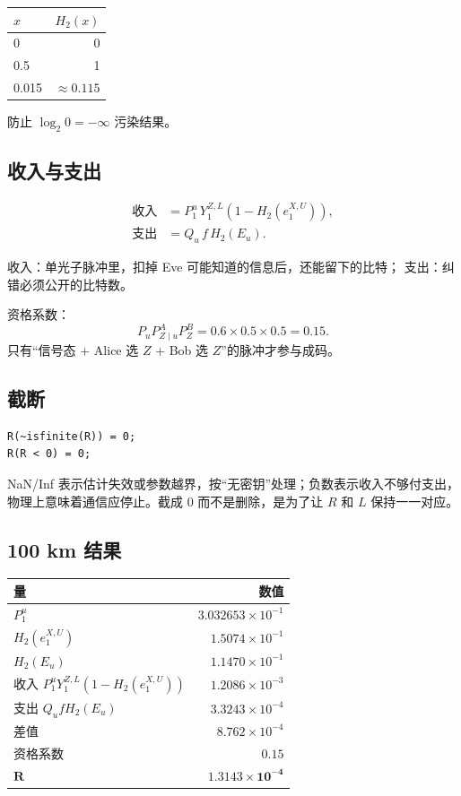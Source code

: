 \documentclass[UTF8,11pt,a4paper]{ctexart}
\newcommand{\code}[1]{\texttt{\detokenize{#1}}}
\newcommand{\Htwo}{H_2}
\newcommand{\YoneZ}{Y_1^{Z,L}}
\newcommand{\eoneX}{e_1^{X,U}}
\begin{document}
\begin{center}
\begin{tabular}{@{}lr@{}}
\toprule
$x$ & $\Htwo(x)$\\
\midrule
0 & 0\\
0.5 & 1\\
0.015 & $\approx0.115$\\
\bottomrule
\end{tabular}
\end{center}

\code{max(., realmin)} 防止 $\log_2 0=-\infty$ 污染结果。

\subsection{收入与支出}

\begin{align}
\text{收入}&=P_1^u\,\YoneZ\left(1-\Htwo(\eoneX)\right),\\
\text{支出}&=Q_u\,f\,\Htwo(E_u).
\end{align}

收入：单光子脉冲里，扣掉 Eve 可能知道的信息后，还能留下的比特；
支出：纠错必须公开的比特数。

资格系数：
\[
P_uP_{Z\mid u}^{A}P_Z^{B}=0.6\times0.5\times0.5=0.15.
\]
只有“信号态 $+$ Alice 选 $Z$ $+$ Bob 选 $Z$”的脉冲才参与成码。

\subsection{截断}

\begin{lstlisting}
R(~isfinite(R)) = 0;
R(R < 0) = 0;
\end{lstlisting}

NaN/Inf 表示估计失效或参数越界，按“无密钥”处理；负数表示收入不够付支出，
物理上意味着通信应停止。截成 0 而不是删除，是为了让 $R$ 和 $L$ 保持一一对应。

\subsection{100 km 结果}

\begin{center}
\begin{tabular}{@{}lr@{}}
\toprule
量 & 数值\\
\midrule
$P_1^u$ & $3.032653\times10^{-1}$\\
$\Htwo(\eoneX)$ & $1.5074\times10^{-1}$\\
$\Htwo(E_u)$ & $1.1470\times10^{-1}$\\
收入 $P_1^u\YoneZ(1-\Htwo(\eoneX))$ & $1.2086\times10^{-3}$\\
支出 $Q_uf\Htwo(E_u)$ & $3.3243\times10^{-4}$\\
差值 & $8.762\times10^{-4}$\\
资格系数 & $0.15$\\
\textbf{$\bm{R}$} & $\bm{1.3143\times10^{-4}}$\\
\bottomrule
\end{tabular}
\end{center}
\end{document}
